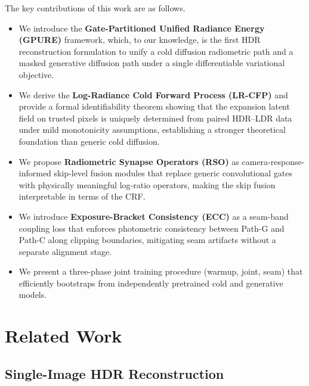\documentclass[10pt,twocolumn,letterpaper]{article}
\begin{document}
The key contributions of this work are as follows.

\begin{itemize}
\item We introduce the \textbf{Gate-Partitioned Unified Radiance Energy (GPURE)} framework, which, to our knowledge, is the first HDR reconstruction formulation to unify a cold diffusion radiometric path and a masked generative diffusion path under a single differentiable variational objective.
\item We derive the \textbf{Log-Radiance Cold Forward Process (LR-CFP)} and provide a formal identifiability theorem showing that the expansion latent field on trusted pixels is uniquely determined from paired HDR--LDR data under mild monotonicity assumptions, establishing a stronger theoretical foundation than generic cold diffusion.
\item We propose \textbf{Radiometric Synapse Operators (RSO)} as camera-response-informed skip-level fusion modules that replace generic convolutional gates with physically meaningful log-ratio operators, making the skip fusion interpretable in terms of the CRF.
\item We introduce \textbf{Exposure-Bracket Consistency (ECC)} as a seam-band coupling loss that enforces photometric consistency between Path-G and Path-C along clipping boundaries, mitigating seam artifacts without a separate alignment stage.
\item We present a three-phase joint training procedure (warmup, joint, seam) that efficiently bootstraps from independently pretrained cold and generative models.
\end{itemize}

\section{Related Work}
\label{sec:related}

\subsection{Single-Image HDR Reconstruction}
\end{document}
